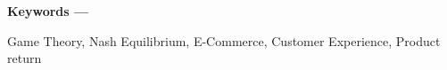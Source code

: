 \documentclass[twoside,leqno,twocolumn]{article}
\providecommand{\keywords}[1]
{
\textbf{Keywords ---} #1
}
\begin{document}
\vspace{0.05cm}
\keywords{\begin{small} Game Theory, Nash Equilibrium, E-Commerce, Customer Experience, Product return\end{small}}
















\end{document}

